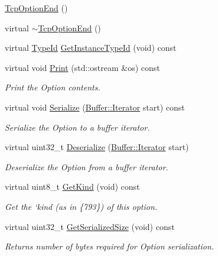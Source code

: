 \begin{DoxyCompactItemize}
\item 
\hyperlink{classns3_1_1TcpOptionEnd_a47ca2829ddc3e30f7a390d3744cd342e}{Tcp\+Option\+End} ()
\item 
virtual \hyperlink{classns3_1_1TcpOptionEnd_a0641171fe62685e5d5253c17d4dfeae0}{$\sim$\+Tcp\+Option\+End} ()
\item 
virtual \hyperlink{classns3_1_1TypeId}{Type\+Id} \hyperlink{classns3_1_1TcpOptionEnd_a61a4aa7650b3e11b6149b95255272225}{Get\+Instance\+Type\+Id} (void) const 
\item 
virtual void \hyperlink{classns3_1_1TcpOptionEnd_aebfe013993b13e32193b91899a2bb451}{Print} (std\+::ostream \&os) const 
\begin{DoxyCompactList}\small\item\em Print the Option contents. \end{DoxyCompactList}\item 
virtual void \hyperlink{classns3_1_1TcpOptionEnd_aa2b70fc2a8d0ed99ba01cb0d832023a1}{Serialize} (\hyperlink{classns3_1_1Buffer_1_1Iterator}{Buffer\+::\+Iterator} start) const 
\begin{DoxyCompactList}\small\item\em Serialize the Option to a buffer iterator. \end{DoxyCompactList}\item 
virtual uint32\+\_\+t \hyperlink{classns3_1_1TcpOptionEnd_aaddbf35e875a772e30b1889354199574}{Deserialize} (\hyperlink{classns3_1_1Buffer_1_1Iterator}{Buffer\+::\+Iterator} start)
\begin{DoxyCompactList}\small\item\em Deserialize the Option from a buffer iterator. \end{DoxyCompactList}\item 
virtual uint8\+\_\+t \hyperlink{classns3_1_1TcpOptionEnd_a0a84f77fbff00989520c237b712b3c8c}{Get\+Kind} (void) const 
\begin{DoxyCompactList}\small\item\em Get the `kind\textquotesingle{} (as in \{793\}) of this option. \end{DoxyCompactList}\item 
virtual uint32\+\_\+t \hyperlink{classns3_1_1TcpOptionEnd_a61d7c7f77664c13d0f94badc0e62d85e}{Get\+Serialized\+Size} (void) const 
\begin{DoxyCompactList}\small\item\em Returns number of bytes required for Option serialization. \end{DoxyCompactList}\end{DoxyCompactItemize}
